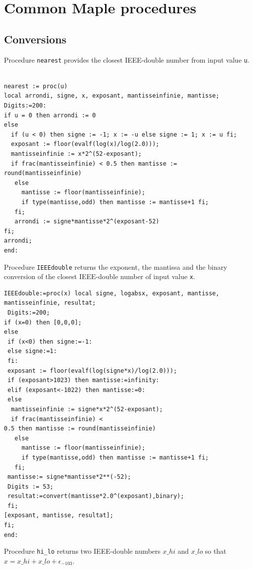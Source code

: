 \section{Common Maple procedures \label{section:commonMaple}}


\subsection{Conversions}

Procedure \texttt{nearest} provides the closest IEEE-double number
from input value \texttt{u}.

\begin{lstlisting}[caption={nearest},firstnumber=1]

nearest := proc(u)
local arrondi, signe, x, exposant, mantisseinfinie, mantisse;
Digits:=200:
if u = 0 then arrondi := 0
else 
  if (u < 0) then signe := -1; x := -u else signe := 1; x := u fi;
  exposant := floor(evalf(log(x)/log(2.0)));
  mantisseinfinie := x*2^(52-exposant);
  if frac(mantisseinfinie) < 0.5 then mantisse := round(mantisseinfinie)
   else
     mantisse := floor(mantisseinfinie);
     if type(mantisse,odd) then mantisse := mantisse+1 fi;
   fi;
   arrondi := signe*mantisse*2^(exposant-52)
fi;
arrondi;
end:
\end{lstlisting}



Procedure \texttt{IEEEdouble} returns the exponent, the mantissa and the
binary conversion of the closest IEEE-double number of input value \texttt{x}.

\begin{lstlisting}[caption={IEEEdouble},firstnumber=1]
IEEEdouble:=proc(x) local signe, logabsx, exposant, mantisse, mantisseinfinie, resultat; 
 Digits:=200;
if (x=0) then [0,0,0]; 
else 
 if (x<0) then signe:=-1:
 else signe:=1:
 fi:
 exposant := floor(evalf(log(signe*x)/log(2.0)));
 if (exposant>1023) then mantisse:=infinity:
 elif (exposant<-1022) then mantisse:=0:
 else 
  mantisseinfinie := signe*x*2^(52-exposant);
  if frac(mantisseinfinie) <
0.5 then mantisse := round(mantisseinfinie)
   else
     mantisse := floor(mantisseinfinie);
     if type(mantisse,odd) then mantisse := mantisse+1 fi;
   fi;
 mantisse:= signe*mantisse*2**(-52);
 Digits := 53;
 resultat:=convert(mantisse*2.0^(exposant),binary);
 fi;
[exposant, mantisse, resultat];
fi;
end:
\end{lstlisting}

Procedure \texttt{hi\_lo} returns two IEEE-double numbers $x\_hi$ and $x\_lo$ so that $x = x\_hi + x\_lo + \epsilon_{-103}$.

